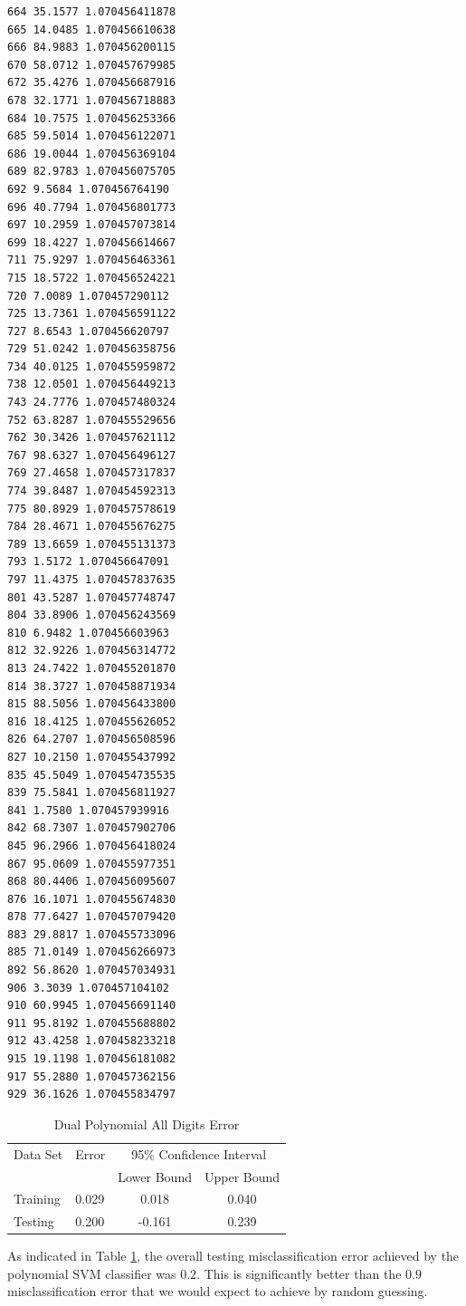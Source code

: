\documentclass{article}
\begin{document}
\begin{verbatim}
664 35.1577 1.070456411878
665 14.0485 1.070456610638
666 84.9883 1.070456200115
670 58.0712 1.070457679985
672 35.4276 1.070456687916
678 32.1771 1.070456718883
684 10.7575 1.070456253366
685 59.5014 1.070456122071
686 19.0044 1.070456369104
689 82.9783 1.070456075705
692 9.5684 1.070456764190
696 40.7794 1.070456801773
697 10.2959 1.070457073814
699 18.4227 1.070456614667
711 75.9297 1.070456463361
715 18.5722 1.070456524221
720 7.0089 1.070457290112
725 13.7361 1.070456591122
727 8.6543 1.070456620797
729 51.0242 1.070456358756
734 40.0125 1.070455959872
738 12.0501 1.070456449213
743 24.7776 1.070457480324
752 63.8287 1.070455529656
762 30.3426 1.070457621112
767 98.6327 1.070456496127
769 27.4658 1.070457317837
774 39.8487 1.070454592313
775 80.8929 1.070457578619
784 28.4671 1.070455676275
789 13.6659 1.070455131373
793 1.5172 1.070456647091
797 11.4375 1.070457837635
801 43.5287 1.070457748747
804 33.8906 1.070456243569
810 6.9482 1.070456603963
812 32.9226 1.070456314772
813 24.7422 1.070455201870
814 38.3727 1.070458871934
815 88.5056 1.070456433800
816 18.4125 1.070455626052
826 64.2707 1.070456508596
827 10.2150 1.070455437992
835 45.5049 1.070454735535
839 75.5841 1.070456811927
841 1.7580 1.070457939916
842 68.7307 1.070457902706
845 96.2966 1.070456418024
867 95.0609 1.070455977351
868 80.4406 1.070456095607
876 16.1071 1.070455674830
878 77.6427 1.070457079420
883 29.8817 1.070455733096
885 71.0149 1.070456266973
892 56.8620 1.070457034931
906 3.3039 1.070457104102
910 60.9945 1.070456691140
911 95.8192 1.070455688802
912 43.4258 1.070458233218
915 19.1198 1.070456181082
917 55.2880 1.070457362156
929 36.1626 1.070455834797

\end{verbatim}

\begin{table}\label{tablefull}
\caption{Dual Polynomial All Digits Error}
\begin{center}
\begin{tabular}{llcc}
\toprule
Data Set & Error & \multicolumn{2}{c}{95\% Confidence Interval} \\
\cmidrule(r){3-4}
& & Lower Bound & Upper Bound \\
\midrule
Training & 0.029 & 0.018 & 0.040 \\
Testing & 0.200 & -0.161 & 0.239 \\
\bottomrule
\end{tabular}
\end{center}
\end{table}

As indicated in Table \ref{tablefull}, the overall testing misclassification error achieved by the polynomial SVM classifier was \(0.2\). This is significantly better than the \(0.9\) misclassification error that we would expect to achieve by random guessing.
\end{document}
